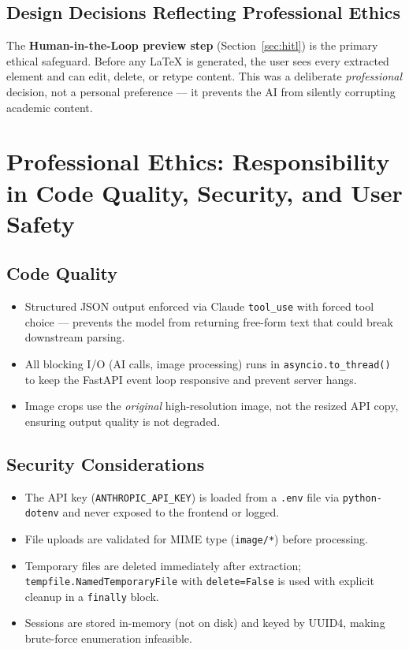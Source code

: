 \documentclass[12pt,a4paper]{article}
\begin{document}
\subsection{Design Decisions Reflecting Professional Ethics}

The \textbf{Human-in-the-Loop preview step} (Section~\ref{sec:hitl}) is the primary ethical
safeguard. Before any \LaTeX{} is generated, the user sees every extracted element and can edit,
delete, or retype content. This was a deliberate \emph{professional} decision, not a personal
preference — it prevents the AI from silently corrupting academic content.


\section{Professional Ethics: Responsibility in Code Quality, Security, and User Safety}

\subsection{Code Quality}
\begin{itemize}[noitemsep]
  \item Structured JSON output enforced via Claude \texttt{tool\_use} with forced tool choice —
    prevents the model from returning free-form text that could break downstream parsing.
  \item All blocking I/O (AI calls, image processing) runs in \texttt{asyncio.to\_thread()} to
    keep the FastAPI event loop responsive and prevent server hangs.
  \item Image crops use the \emph{original} high-resolution image, not the resized API copy,
    ensuring output quality is not degraded.
\end{itemize}

\subsection{Security Considerations}
\begin{itemize}[noitemsep]
  \item The API key (\texttt{ANTHROPIC\_API\_KEY}) is loaded from a \texttt{.env} file via
    \texttt{python-dotenv} and never exposed to the frontend or logged.
  \item File uploads are validated for MIME type (\texttt{image/*}) before processing.
  \item Temporary files are deleted immediately after extraction; \texttt{tempfile.NamedTemporaryFile}
    with \texttt{delete=False} is used with explicit cleanup in a \texttt{finally} block.
  \item Sessions are stored in-memory (not on disk) and keyed by UUID4, making brute-force
    enumeration infeasible.
\end{itemize}
\end{document}
